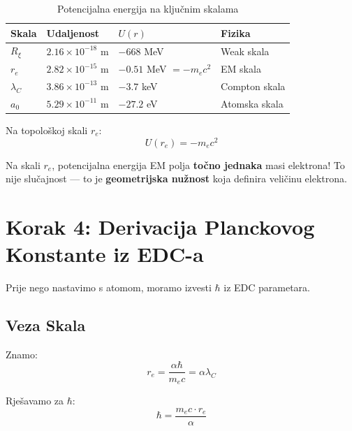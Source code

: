 \documentclass[12pt,a4paper]{article}
\begin{document}
\begin{table}[H]
\centering
\begin{tabular}{@{}llll@{}}
\toprule
\textbf{Skala} & \textbf{Udaljenost} & \textbf{$U(r)$} & \textbf{Fizika} \\
\midrule
$R_\xi$ & $2.16 \times 10^{-18}$ m & $-668$ MeV & Weak skala \\
$r_e$ & $2.82 \times 10^{-15}$ m & $-0.51$ MeV $= -m_e c^2$ & EM skala \\
$\lambda_C$ & $3.86 \times 10^{-13}$ m & $-3.7$ keV & Compton skala \\
$a_0$ & $5.29 \times 10^{-11}$ m & $-27.2$ eV & Atomska skala \\
\bottomrule
\end{tabular}
\caption{Potencijalna energija na ključnim skalama}
\end{table}

\begin{keyresult}
Na topološkoj skali $r_e$:
\begin{equation}
\boxed{U(r_e) = -m_e c^2}
\end{equation}

Na skali $r_e$, potencijalna energija EM polja \textbf{točno jednaka} masi elektrona! To nije slučajnost — to je \textbf{geometrijska nužnost} koja definira veličinu elektrona.
\end{keyresult}

\section{Korak 4: Derivacija Planckovog Konstante iz EDC-a}

Prije nego nastavimo s atomom, moramo izvesti $\hbar$ iz EDC parametara.

\subsection{Veza Skala}

Znamo:
\begin{equation}
r_e = \frac{\alpha \hbar}{m_e c} = \alpha \lambda_C
\end{equation}

Rješavamo za $\hbar$:
\begin{equation}
\hbar = \frac{m_e c \cdot r_e}{\alpha}
\end{equation}
\end{document}
